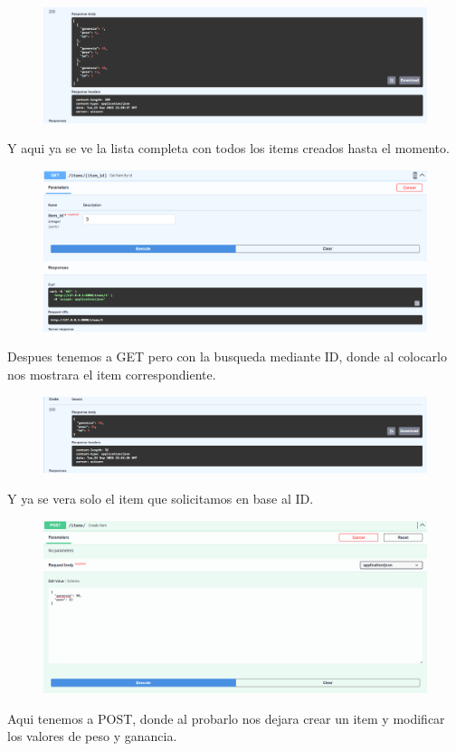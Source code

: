 \documentclass[12pt]{article}
\begin{document}
\begin{figure}[H]
    \centering
    \includegraphics[width=1\textwidth]{Imagenes/GET2.png}
\end{figure}
Y aqui ya se ve la lista completa con todos los items creados hasta el momento.

\begin{figure}[H]
    \centering
    \includegraphics[width=1\textwidth]{Imagenes/GETID1.png}
\end{figure}
Despues tenemos a GET pero con la busqueda mediante ID, donde al colocarlo nos mostrara el item correspondiente.

\begin{figure}[H]
    \centering
    \includegraphics[width=1\textwidth]{Imagenes/GETID2.png}
\end{figure}
Y ya se vera solo el item que solicitamos en base al ID.

\begin{figure}[H]
    \centering
    \includegraphics[width=1\textwidth]{Imagenes/POST1.png}
\end{figure}
Aqui tenemos a POST, donde al probarlo nos dejara crear un item y modificar los valores de peso y ganancia.
\end{document}
